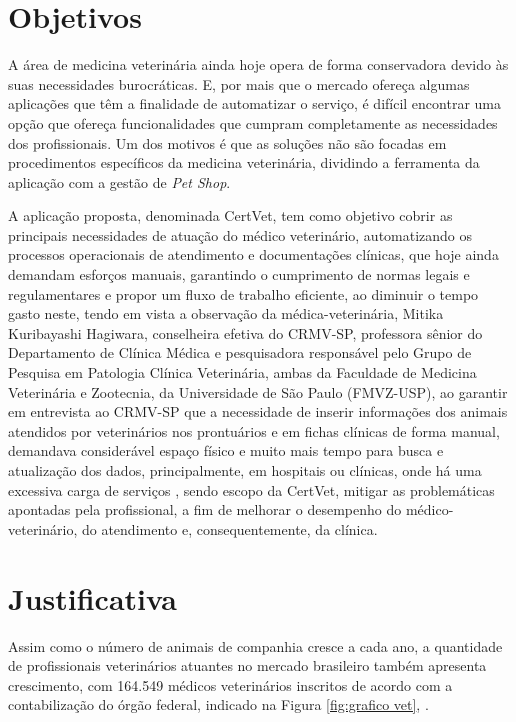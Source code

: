 \documentclass[
    12pt,               %
    openright,          %
    oneside,
    a4paper,            %
    BIBLATEX,           %
    TODO,               %
    english,            %
    brazil              %
    ]{ifsp-spo-inf-ctds}
\begin{document}
    \section{Objetivos} \label{objetivos}

    A área de medicina veterinária ainda hoje opera de forma conservadora devido às suas necessidades burocráticas. E, por mais que o mercado ofereça algumas aplicações que têm a finalidade de automatizar o serviço, é difícil encontrar uma opção que ofereça funcionalidades que cumpram completamente as necessidades dos profissionais. Um dos motivos é que as soluções não são focadas em procedimentos específicos da medicina veterinária, dividindo a ferramenta da aplicação com a gestão de \emph{Pet Shop}.

    A aplicação proposta, denominada CertVet, tem como objetivo cobrir as principais necessidades de atuação do médico veterinário, automatizando os processos operacionais de atendimento e documentações clínicas, que hoje ainda demandam esforços manuais, garantindo o cumprimento de normas legais e regulamentares e propor um fluxo de trabalho eficiente, ao diminuir o tempo gasto neste, tendo em vista a observação da médica-veterinária, Mitika Kuribayashi Hagiwara, conselheira efetiva do CRMV-SP, professora sênior do Departamento de Clínica Médica e pesquisadora responsável pelo Grupo de Pesquisa em Patologia Clínica Veterinária, ambas da Faculdade de Medicina Veterinária e Zootecnia, da Universidade de São Paulo (FMVZ-USP), ao garantir em entrevista ao CRMV-SP que a necessidade de inserir informações dos animais atendidos por veterinários nos prontuários e em fichas clínicas de forma manual, demandava considerável espaço físico e muito mais tempo para busca e atualização dos dados, principalmente, em hospitais ou clínicas, onde há uma excessiva carga de serviços \cite{mitika}, sendo escopo da CertVet, mitigar as problemáticas apontadas pela profissional, a fim de melhorar o desempenho do médico-veterinário, do atendimento e, consequentemente, da clínica.


    \section{Justificativa}\label{justificativa}

    Assim como o número de animais de companhia cresce a cada ano, a quantidade de profissionais veterinários atuantes no mercado brasileiro também apresenta crescimento, com 164.549 médicos veterinários inscritos de acordo com a contabilização do órgão federal, indicado na Figura \ref{fig:grafico vet}, .
\end{document}
